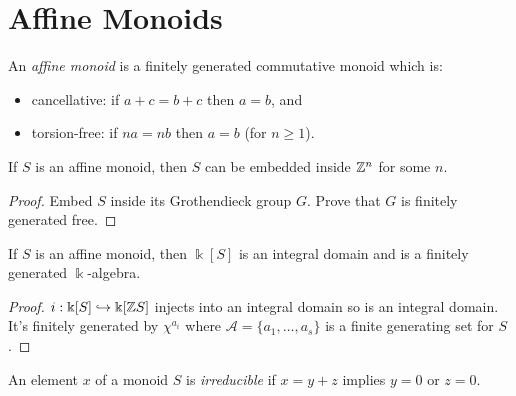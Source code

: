 \section{Affine Monoids}


\begin{definition}
  \label{0-aff-mon}
  \leanok

  An \emph{affine monoid} is a finitely generated commutative monoid which is:
  \begin{itemize}
    \item cancellative: if $a + c = b + c$ then $a = b$, and
    \item torsion-free: if $n a = n b$ then $a = b$ (for $n \geq 1$).
  \end{itemize}
\end{definition}


\begin{proposition}
  \label{0-embed-aff-mon}

  If $S$ is an affine monoid, then $S$ can be embedded inside ${\mathbb Z}^n$ for some $n$.
\end{proposition}
\begin{proof}
  \uses{}

  Embed $S$ inside its Grothendieck group $G$. Prove that $G$ is finitely generated free.
\end{proof}


\begin{proposition}
  \label{0-aff-mon-alg-domain}

  If $S$ is an affine monoid, then $\Bbbk[S]$ is an integral domain and is a finitely generated $\Bbbk$-algebra.
\end{proposition}
\begin{proof}

  $i : \Bbbk[S] \hookrightarrow \Bbbk[{\mathbb Z} S]$ injects into an integral domain so is an integral domain. It's finitely generated by $\chi^{a_i}$ where $\mathcal A = \{a_1, \dotsc, a_s\}$ is a finite generating set for $S$.
\end{proof}


\begin{definition}
  \label{0-irred}
  \uses{}

  An element $x$ of a monoid $S$ is \emph{irreducible} if $x = y + z$ implies $y = 0$ or $z = 0$.
\end{definition}


